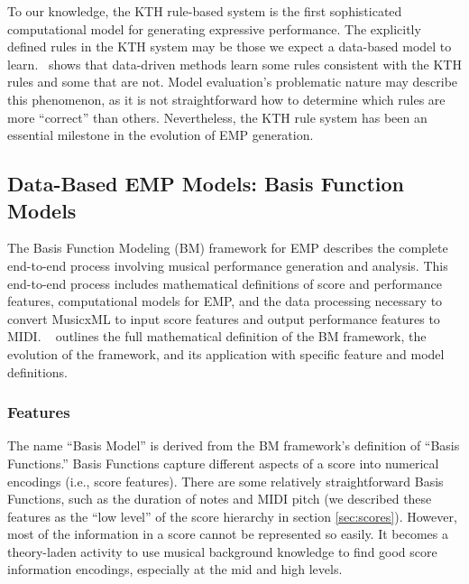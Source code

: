 To our knowledge, the KTH rule-based system is the first sophisticated computational model for generating expressive performance. The explicitly defined rules in the KTH system may be those we expect a data-based model to learn.~\citet{widmer2002machine} shows that data-driven methods learn some rules consistent with the KTH rules and some that are not. Model evaluation's problematic nature may describe this phenomenon, as it is not straightforward how to determine which rules are more ``correct'' than others. Nevertheless, the KTH rule system has been an essential milestone in the evolution of EMP generation. 

\subsection{Data-Based EMP Models: Basis Function Models}\label{sec:data-based}
The Basis Function Modeling (BM) framework for EMP describes the complete end-to-end process involving musical performance generation and analysis. This end-to-end process includes mathematical definitions of score and performance features, computational models for EMP, and the data processing necessary to convert MusicxML to input score features and output performance features to MIDI.%
~\citet{eduardo2018computational} outlines the full mathematical definition of the BM framework, the evolution of the framework, and its application with specific feature and model definitions.

\subsubsection{Features}
The name ``Basis Model'' is derived from the BM framework's definition of ``Basis Functions.'' Basis Functions capture different aspects of a score into numerical encodings (i.e., score features). There are some relatively straightforward Basis Functions, such as the duration of notes and MIDI pitch (we described these features as the ``low level'' of the score hierarchy in section \ref{sec:scores}). However, most of the information in a score cannot be represented so easily. It becomes a theory-laden activity to use musical background knowledge to find good score information encodings, especially at the mid and high levels.

\newcommand{\mperf}{\beta_{\Omega}}

